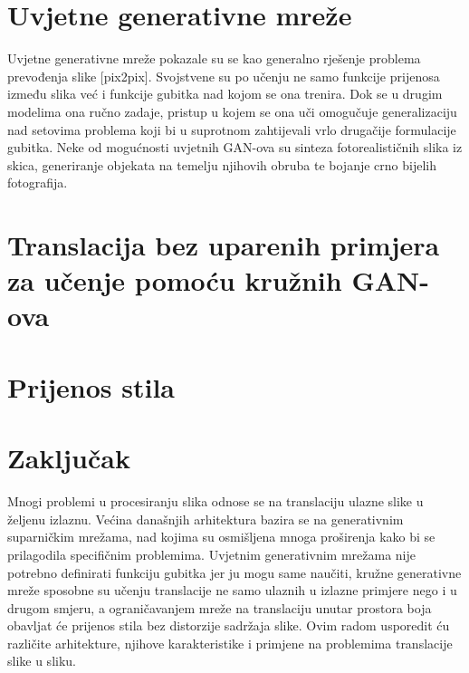 \documentclass[lmodern, utf8, seminar]{fer}
\begin{document}
\chapter{Uvjetne generativne mreže}
Uvjetne generativne mreže pokazale su se kao generalno rješenje problema prevođenja slike [pix2pix]. Svojstvene su po učenju ne samo funkcije prijenosa između slika već i funkcije gubitka nad kojom se ona trenira.
Dok se u drugim modelima ona ručno zadaje, pristup u kojem se ona uči omogučuje generalizaciju nad setovima problema koji bi u suprotnom zahtijevali vrlo drugačije formulacije gubitka.
\newline
Neke od mogućnosti uvjetnih GAN-ova su sinteza fotorealističnih slika iz skica, generiranje objekata na temelju njihovih obruba te bojanje crno bijelih fotografija.



\chapter{Translacija bez uparenih primjera za učenje pomoću kružnih GAN-ova}




\chapter{Prijenos stila}




\chapter{Zaključak}









\begin{sazetak}
Mnogi problemi u procesiranju slika odnose se na translaciju ulazne slike u željenu izlaznu. Većina današnjih arhitektura bazira se na generativnim suparničkim mrežama, nad kojima su osmišljena mnoga proširenja kako bi se prilagodila specifičnim problemima. Uvjetnim generativnim mrežama nije potrebno definirati funkciju gubitka jer ju mogu same naučiti, kružne generativne mreže sposobne su učenju translacije ne samo ulaznih u izlazne primjere nego i u drugom smjeru, a ograničavanjem mreže na translaciju unutar prostora boja obavljat će prijenos stila bez distorzije sadržaja slike. Ovim radom usporedit ću različite arhitekture, njihove karakteristike i primjene na problemima translacije slike u sliku.

\end{sazetak}

\begin{abstract}

\end{abstract}
\end{document}
